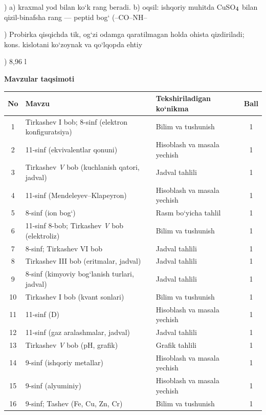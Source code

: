 \documentclass[11pt,a4paper]{article}
\renewcommand{\textsubscript}[1]{\ensuremath{_{\text{\fontsize{8}{8}\selectfont #1}}}}
\begin{document}
) a) kraxmal yod bilan ko`k rang beradi. b) oqsil: ishqoriy muhitda CuSO\textsubscript{4} bilan qizil-binafsha rang --- peptid bog` (--CO--NH--\par
{}) Probirka qisqichda tik, og`zi odamga qaratilmagan holda ohista qizdiriladi; kons. kislotani ko`zoynak va qo`lqopda ehtiy\par
{}) 8,96 l\par
\par\bigskip\noindent\textbf{Mavzular taqsimoti}\par\smallskip
{\small\noindent\begin{longtable}{|c|p{7.2cm}|p{5.4cm}|c|}\hline \textbf{No} & \textbf{Mavzu} & \textbf{Tekshiriladigan ko`nikma} & \textbf{Ball}\\\hline
1 & Tirkashev I bob; 8-sinf (elektron konfiguratsiya) & Bilim va tushunish & 1\\\hline
2 & 11-sinf (ekvivalentlar qonuni) & Hisoblash va masala yechish & 1\\\hline
3 & Tirkashev \textit{V} bob (kuchlanish qatori, jadval) & Jadval tahlili & 1\\\hline
4 & 11-sinf (Mendeleyev--Klapeyron) & Hisoblash va masala yechish & 1\\\hline
5 & 8-sinf (ion bog`) & Rasm bo`yicha tahlil & 1\\\hline
6 & 11-sinf 8-bob; Tirkashev \textit{V} bob (elektroliz) & Bilim va tushunish & 1\\\hline
7 & 8-sinf; Tirkashev VI bob & Jadval tahlili & 1\\\hline
8 & Tirkashev III bob (eritmalar, jadval) & Jadval tahlili & 1\\\hline
9 & 8-sinf (kimyoviy bog`lanish turlari, jadval) & Jadval tahlili & 1\\\hline
10 & Tirkashev I bob (kvant sonlari) & Bilim va tushunish & 1\\\hline
11 & 11-sinf (D) & Hisoblash va masala yechish & 1\\\hline
12 & 11-sinf (gaz aralashmalar, jadval) & Jadval tahlili & 1\\\hline
13 & Tirkashev \textit{V} bob (pH, grafik) & Grafik tahlili & 1\\\hline
14 & 9-sinf (ishqoriy metallar) & Hisoblash va masala yechish & 1\\\hline
15 & 9-sinf (alyuminiy) & Hisoblash va masala yechish & 1\\\hline
16 & 9-sinf; Tashev (Fe, Cu, Zn, Cr) & Bilim va tushunish & 1\\\hline

\end{longtable}}
\end{document}
